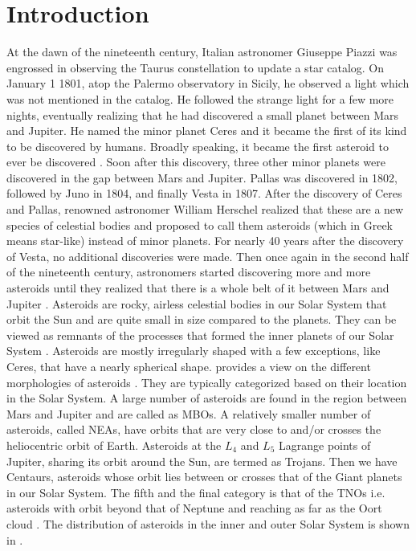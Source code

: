 \chapter{Introduction}
\label{chap:intro}
\graphicspath{{Introduction/Images/}}

At the dawn of the nineteenth century, Italian astronomer Giuseppe Piazzi was engrossed in observing the Taurus constellation to update a star catalog. On January 1 1801, atop the Palermo observatory in Sicily, he observed a light which was not mentioned in the catalog. He followed the strange light for a few more nights, eventually realizing that he had discovered a small planet between Mars and Jupiter. He named the minor planet Ceres and it became the first of its kind to be discovered by humans. Broadly speaking, it became the first asteroid to ever be discovered \parencite{cunningham2016discovery}. Soon after this discovery, three other minor planets were discovered in the gap between Mars and Jupiter. Pallas was discovered in 1802, followed by Juno in 1804, and finally Vesta in 1807. After the discovery of Ceres and Pallas, renowned astronomer William Herschel realized that these are a new species of celestial bodies and proposed to call them asteroids (which in Greek means star-like) instead of minor planets. For nearly 40 years after the discovery of Vesta, no additional discoveries were made. Then once again in the second half of the nineteenth century, astronomers started discovering more and more asteroids until they realized that there is a whole belt of it between Mars and Jupiter \parencite{bottke2002asteroids}.
%
\newline\newline
%
Asteroids are rocky, airless celestial bodies in our Solar System that orbit the Sun and are quite small in size compared to the planets. They can be viewed as remnants of the processes that formed the inner planets of our Solar System \parencite{nasa_asteroids_web}. Asteroids are mostly irregularly shaped with a few exceptions, like Ceres, that have a nearly spherical shape.  provides a view on the different morphologies of asteroids \parencite{nasa_asteroids_web}. They are typically categorized based on their location in the Solar System. A large number of asteroids are found in the region between Mars and Jupiter and are called as \glspl{MBO}. A relatively smaller number of asteroids, called \glspl{NEA}, have orbits that are very close to and/or crosses the heliocentric orbit of Earth. Asteroids at the $L_4$ and $L_5$ Lagrange points of Jupiter, sharing its orbit around the Sun, are termed as Trojans. Then we have Centaurs, asteroids whose orbit lies between or crosses that of the Giant planets in our Solar System. The fifth and the final category is that of the \glspl{TNO} i.e. asteroids with orbit beyond that of Neptune and reaching as far as the Oort cloud \parencite{planetarySciencePater}. The distribution of asteroids in the inner and outer Solar System is shown in .

